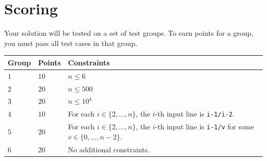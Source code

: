 \section*{Scoring}
Your solution will be tested on a set of test groups.
To earn points for a group, you must pass all test cases in that group.

\noindent
\begin{tabular}{| l | l | p{12cm} |}
  \hline
  \textbf{Group} & \textbf{Points} & \textbf{Constraints} \\ \hline
  $1$ & $10$ & $n \leq 6$ \\ \hline
  $2$ & $20$ & $n \leq 500$ \\ \hline
  $3$ & $20$ & $n \leq 10^4$ \\ \hline
  $4$ & $10$ & For each $i \in \{2, \ldots, n\}$, the $i$-th input line is
               \texttt{i-1/i-2}. \\ \hline
  $5$ & $20$ & For each $i \in \{2, \ldots, n\}$, the $i$-th input line is
               \texttt{i-1/v} for some $v \in \{0, \ldots, n-2\}$. \\ \hline
  $6$ & $20$ & No additional constraints. \\ \hline
\end{tabular}
